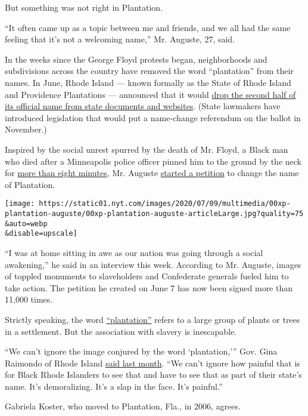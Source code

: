 But something was not right in Plantation.

``It often came up as a topic between me and friends, and we all had the
same feeling that it's not a welcoming name,'' Mr. Auguste, 27, said.

In the weeks since the George Floyd protests began, neighborhoods and
subdivisions across the country have removed the word ``plantation''
from their names. In June, Rhode Island --- known formally as the State
of Rhode Island and Providence Plantations --- announced that it would
\href{https://www.nytimes.com/2020/06/23/us/politics/rhode-island-plantation.html}{drop
the second half of its official name from state documents and websites}.
(State lawmakers have introduced legislation that would put a
name-change referendum on the ballot in November.)

Inspired by the social unrest spurred by the death of Mr. Floyd, a Black
man who died after a Minneapolis police officer pinned him to the ground
by the neck for
\href{https://www.nytimes.com/2020/06/18/us/george-floyd-timing.html}{more
than eight minutes}, Mr. Auguste
\href{https://www.change.org/p/ron-desantis-changing-the-name-of-the-city-of-plantation}{started
a petition} to change the name of Plantation.

\texttt{[image: https://static01.nyt.com/images/2020/07/09/multimedia/00xp-plantation-auguste/00xp-plantation-auguste-articleLarge.jpg?quality=75\\\&auto=webp\\\&disable=upscale]}

``I was at home sitting in awe as our nation was going through a social
awakening,'' he said in an interview this week. According to Mr.
Auguste, images of toppled monuments to slaveholders and Confederate
generals fueled him to take action. The petition he created on June 7
has now been signed more than 11,000 times.

Strictly speaking, the word
\href{https://www.merriam-webster.com/dictionary/plantation}{``plantation''}
refers to a large group of plants or trees in a settlement. But the
association with slavery is inescapable.

``We can't ignore the image conjured by the word `plantation,''' Gov.
Gina Raimondo of Rhode Island
\href{https://www.nytimes.com/2020/06/23/us/politics/rhode-island-plantation.html}{said
last month}. ``We can't ignore how painful that is for Black Rhode
Islanders to see that and have to see that as part of their state's
name. It's demoralizing. It's a slap in the face. It's painful.''

Gabriela Koster, who moved to Plantation, Fla., in 2006, agrees.

